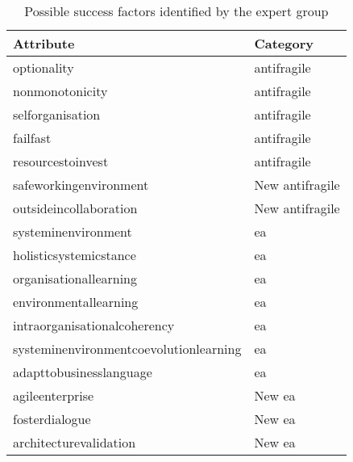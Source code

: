 \begin{longtable}{@{}ll@{}}
	\toprule%
	\textbf{Attribute} & \textbf{Category}  \\%
	\midrule%
	\endhead%
	\hline
	\endfoot%
	\caption[Possible success factors identified by the expert group]{Possible success factors identified by the expert group}
	\label{tab:expertgrouppossiblesf}
	\endlastfoot%
	\Gls{optionality} & \Gls{antifragile} \\%
	\Gls{nonmonotonicity} & \Gls{antifragile} \\%
	\Gls{selforganisation} & \Gls{antifragile} \\%
	\Gls{failfast} & \Gls{antifragile} \\%
	\Gls{resourcestoinvest} & \Gls{antifragile} \\%
	\Gls{safeworkingenvironment} & New \Gls{antifragile} \\%
	\Gls{outsideincollaboration} & New \Gls{antifragile} \\%
	\Gls{systeminenvironment} & \acrlong{ea} \\%
	\Gls{holisticsystemicstance} & \acrlong{ea} \\%
	\Gls{organisationallearning} & \acrlong{ea} \\%
	\Gls{environmentallearning} & \acrlong{ea} \\%
	\Gls{intraorganisationalcoherency} & \acrlong{ea} \\%
	\Gls{systeminenvironmentcoevolutionlearning} & \acrlong{ea} \\%
	\Gls{adapttobusinesslanguage} & \acrlong{ea} \\%
	\Gls{agileenterprise} & New \acrlong{ea} \\%
	\Gls{fosterdialogue} & New \acrlong{ea} \\%
	\Gls{architecturevalidation} & New \acrlong{ea} \\%
	\bottomrule%
\end{longtable}%
